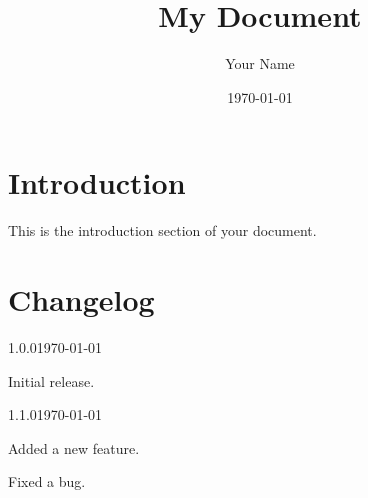 \documentclass{article}
\begin{document}
\title{My Document}
\author{Your Name}
\date{\today}

\maketitle

\section{Introduction}
This is the introduction section of your document.

\section{Changelog}

\begin{changelog}
  \begin{release}{1.0.0}{\today}
    \item Initial release.
  \end{release}

  \begin{release}{1.1.0}{\today}
    \item Added a new feature.
    \item Fixed a bug.
  \end{release}
\end{changelog}
\end{document}
